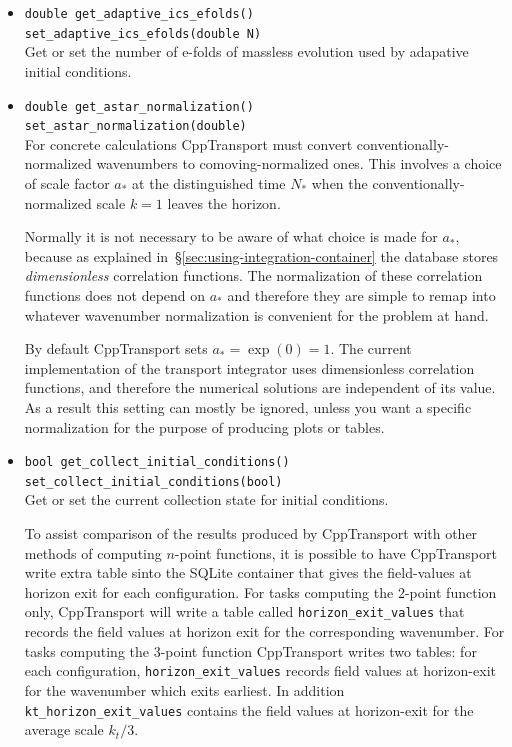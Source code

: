\documentclass[11pt,a4paper]{article}
\newcommand{\Nstar}{N_{\ast}}
\newcommand{\astar}{a_{\ast}}
\newcommand{\packagefont}{\sffamily}
\newcommand{\CppTransport}{{\packagefont CppTransport}}
\newcommand{\SQLite}{{\packagefont SQLite}}
\begin{document}
\begin{itemize}
    \item \texttt{double get_adaptive_ics_efolds()} \\
    \texttt{set_adaptive_ics_efolds(double N)} \\
    Get or set the number of e-folds of massless evolution used by adapative
    initial conditions.
    
    \item \texttt{double get_astar_normalization()} \\
    \texttt{set_astar_normalization(double)} \\
    \label{method:set_astar_normalization}
    For concrete calculations {\CppTransport} must convert conventionally-normalized
    wavenumbers to comoving-normalized ones.
    This involves a choice of scale factor $\astar$ at the distinguished
    time $\Nstar$ when the conventionally-normalized scale $k=1$ leaves the
    horizon.

    Normally it is not necessary to be aware of what choice is made for
    $\astar$, because as explained in~\S\ref{sec:using-integration-container}
    the database stores \emph{dimensionless} correlation functions.
    The normalization of these correlation functions does not depend on
    $\astar$
    and therefore they are simple to remap into whatever wavenumber
    normalization is convenient for the problem at hand.
     
    By default {\CppTransport} sets
    $\astar = \exp(0) = 1$.
    The current implementation of the
    transport integrator uses dimensionless
    correlation functions, and therefore the numerical
    solutions are independent of its value.
    As a result this setting can mostly be ignored, unless
    you want a specific normalization for the purpose of producing
    plots or tables.
    
    \item \texttt{bool get_collect_initial_conditions()} \\
    \texttt{set_collect_initial_conditions(bool)} \\
    Get or set the current collection state for initial conditions.
    
    To assist comparison of the results produced by {\CppTransport} with
    other methods of computing $n$-point functions,
    it is possible to have {\CppTransport} write extra
    table sinto the {\SQLite} container that gives the field-values
    at horizon exit for each configuration.
    For tasks computing the 2-point function only,
    {\CppTransport} will write a table called
    \texttt{horizon_exit_values}
    that records the
    field values at horizon exit for the corresponding wavenumber.
    For tasks computing the 3-point function {\CppTransport}
    writes two tables:
    for each configuration,
    \texttt{horizon_exit_values}
    records field values at horizon-exit for the
    wavenumber which exits
    earliest.
    In addition \texttt{kt_horizon_exit_values}
    contains the field values at horizon-exit for the
    average scale $k_t/3$.
    

\end{itemize}
\end{document}
